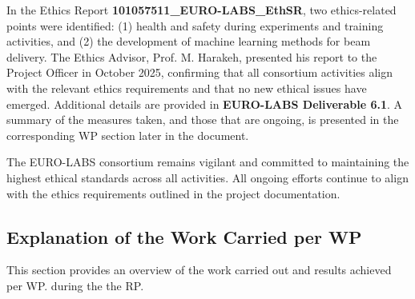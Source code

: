 

In the Ethics Report \textbf{101057511\_EURO-LABS\_EthSR}, two ethics-related points were identified: (1) health and safety during experiments and training activities, and (2) the development of machine learning methods for beam delivery. The Ethics Advisor, Prof. M. Harakeh, presented his report to the Project Officer in October 2025, confirming that all consortium activities align with the relevant ethics requirements and that no new ethical issues have emerged. Additional details are provided in \textbf{EURO-LABS Deliverable 6.1}. A summary of the measures taken, and those that are ongoing, is presented in the corresponding WP section later in the document. 

The EURO-LABS consortium remains vigilant and committed to maintaining the highest ethical standards across all activities. All ongoing efforts continue to align with the ethics requirements outlined in the project documentation.


\subsection{Explanation of the Work Carried per WP}

This section provides an overview of the work carried out and results achieved per WP. 
during the the  \acrshort{RP}.   







% 










